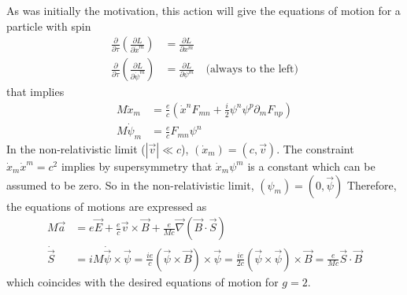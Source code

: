 \documentclass[a4paper,12pt]{article}
\numberwithin{equation}{section}
\numberwithin{exe}{section}
\newcommand{\p}{{\partial}}
\newcommand{\xd}{{\dot x}}
\begin{document}
As was initially the motivation, this action will give the equations of motion for a particle with spin
	\begin{equation}
		\begin{aligned}
		\frac{\p}{\p\tau}\left(\frac{\p L}{\p\xd^m}\right) & = \frac{\p L}{\p x^m} \\
		\frac{\p}{\p\tau}\left(\frac{\p L}{\p\dot\psi^m}\right) & = \frac{\p L}{\p \psi^m} \quad\text{(always to the left)}
		\end{aligned}
	\end{equation}
that implies
	\begin{align}
	M\ddot x_m & = \frac{e}{c}(\xd^n F_{mn} + \frac{i}{2} \psi^n \psi^p \p_m F_{np}) \\
	M \dot\psi_m & = \frac{e}{c} F_{mn} \psi^n
	\end{align}
In the non-relativistic limit ($|\vec v|\ll c$), $(\xd_m)=(c,\vec v)$. The constraint $\xd_m \xd^m=c^2$ implies by supersymmetry that 
$\xd_m \psi^m$ is a constant which can be assumed to be zero. So in the non-relativistic limit,  $(\psi_m)=(0,\vec\psi)$
Therefore, the equations of motions are expressed as
	\begin{align}
	M\vec a & = e\vec E + \frac{e}{c}\vec v\times \vec B + \frac{e}{Mc}\vec\nabla (\vec B\cdot \vec S) \\
	\dot{\vec S} & = iM\dot{\vec\psi}\times\vec\psi = \frac{ie}{c}(\vec\psi\times\vec B)\times\vec\psi = \frac{ie}{2c}(\vec\psi\times\vec\psi)\times\vec B =  \frac{e}{Mc}\vec S\cdot\vec B
	\end{align}
which coincides with the desired equations of motion for $g=2$.
\end{document}
